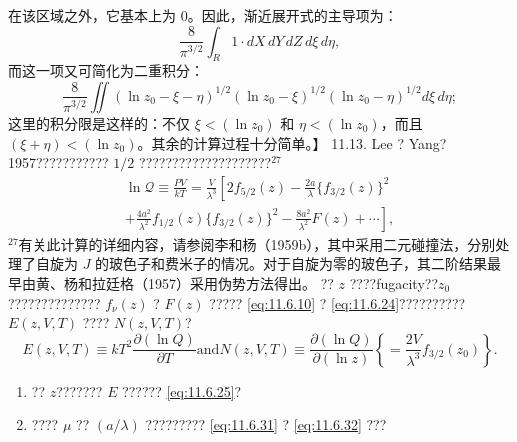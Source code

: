 在该区域之外，它基本上为 0。因此，渐近展开式的主导项为：
\begin{equation}\tag{11.6.100}\label{eq:11.6.100}
\frac { 8 } { \pi ^{3 / 2} } \int _ { R } 1 \cdot d X \, d Y \, d Z \, d \xi \, d \eta ,
\end{equation}
而这一项又可简化为二重积分：
\begin{equation}\tag{11.6.101}\label{eq:11.6.101}
\frac { 8 } { \pi ^{3 / 2} } \iint ( \ln z _ { 0 } - \xi - \eta ) ^{1 / 2} ( \ln z _ { 0 } - \xi ) ^{1 / 2} ( \ln z _ { 0 } - \eta ) ^{1 / 2} d \xi \, d \eta ;
\end{equation}
这里的积分限是这样的：不仅 \(\xi < (\ln z_0)\) 和 \(\eta < (\ln z_0)\)，而且 \((\xi + \eta) < (\ln z_0)\)。其余的计算过程十分简单。】
11.13. Lee ? Yang?1957??????????? \(1/2\) ????????????????????\(^{27}\)
\begin{equation}\tag{11.6.102}\label{eq:11.6.102}
\begin{array}{r} { \ln \mathcal { Q } \equiv \frac { P V } { k T } = \frac { V } { \lambda ^{3} } \left[ 2 f _ { 5 / 2 } ( z ) - \frac { 2 a } { \lambda } \{ f _ { 3 / 2 } ( z ) \} ^{2} \right. } \\{ \left. + \frac { 4 a ^{2} } { \lambda ^{2} } f _ { 1 / 2 } ( z ) \{ f _ { 3 / 2 } ( z ) \} ^{2} - \frac { 8 a ^{2} } { \lambda ^{2} } F ( z ) + \cdots \right] , } \end{array}
\end{equation}
\(^{27}\)有关此计算的详细内容，请参阅李和杨（1959b），其中采用二元碰撞法，分别处理了自旋为 \(J\) 的玻色子和费米子的情况。对于自旋为零的玻色子，其二阶结果最早由黄、杨和拉廷格（1957）采用伪势方法得出。
?? \(z\) ????fugacity??\(z_{0}\) ?????????????? \(f_{\nu}(z)\) ? \(F(z)\) ????? \autoref{eq:11.6.10} ? \autoref{eq:11.6.24}?????????? \(E(z,V,T)\) ???? \(N(z,V,T)\)?
\begin{equation}\tag{11.6.103}\label{eq:11.6.103}
E ( z , V , T ) \equiv k T ^{2} \frac { \partial ( \ln Q ) } { \partial T }  \mathrm { a n d }  N ( z , V , T ) \equiv \frac { \partial ( \ln Q ) } { \partial ( \ln z ) } \left\{ = \frac { 2 V } { \lambda ^{3} } f _ { 3 / 2 } ( z _ { 0 } ) \right\} .
\end{equation}
\begin{enumerate}
\def\labelenumi{(\alph{enumi})}
\item
  ?? \(z\)??????? \(E\) ?????? \autoref{eq:11.6.25}?
\item
  ???? \(\mu\) ?? \((a/\lambda)\) ????????? \autoref{eq:11.6.31} ? \autoref{eq:11.6.32} ???
\end{enumerate}
